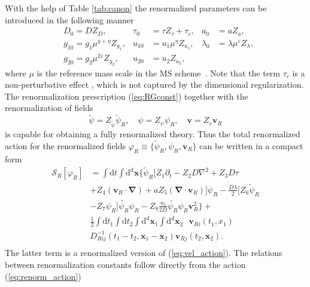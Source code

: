 \documentclass[aps,pre,url,twocolumn,superscriptaddress]{revtex4-1}
\def\eps{\varepsilon}
\def\mv{{\bm v}}
\def\S{\mathcal{S}}
\def\R{{\scriptscriptstyle R}}
\def\dRM{{\mathrm d}}
\def\mx{{\bm x}}
\begin{document}
With the help of Table \ref{tab:canon} the renormalized parameters can be introduced
in the following manner
\begin{align}
   \label{eq:RGconst}
   &D_0 = D Z_D, &\tau_0& = \tau Z_\tau + \tau_c,
     &a_0& = a Z_a,  
     \nonumber \\ 
   &g_{10} = g_{1} \mu^{y+\eta} Z_{g_1}, &u_{10}& = u_1 \mu^\eta Z_{u_1},
   &\lambda_0& = \lambda \mu^{\eps} Z_\lambda, \nonumber
   \\
   &g_{20}=g_2 \mu^{2\eps} Z_{g_2}, &u_{20}& = u_2 Z_{u_2}, 
\end{align}
where $\mu$ is the reference mass scale in the MS scheme~\cite{Zinn}. Note that
the term $\tau_c$ is a non-perturbative effect \cite{Sym73,Schloms89}, which
is not captured by the  dimensional regularization.
The renormalization prescription (\ref{eq:RGconst}) together with the 
renormalization of fields 
\begin{equation}
 \tilde{\psi} = Z_{\tilde{\psi}} \tilde\psi_{\R},\quad
 \psi = Z_\psi \psi_{ \R},\quad
 \mv = Z_v{\mv}_{\R} 
  \label{eq:RGfields}
\end{equation}
is capable for obtaining a fully renormalized theory.
Thus the total renormalized action for
the renormalized fields $\varphi_R \equiv \{\tilde\psi_{\R}, \psi_{\R}, \mv_{\R} \}$ 
  can be written in a compact form
\begin{align}
  \S_R[\varphi_\R] & = \int \dRM t \int \dRM^d \mx
  \biggl\{ \tilde{\psi}_\R \biggl[
  Z_1\partial_t - Z_2 D\nabla^2 + Z_3 D\tau \nonumber \\
  & + Z_4 (\bm{v}_\R\cdot \bm{\nabla}) 
    +  a Z_5 (\bm{\nabla}\cdot\bm{v}_\R) 
   \biggl] \psi_\R
  -  \frac{D\lambda}{2}[Z_6 \tilde{\psi}_\R \nonumber \\
  & - Z_7
  \psi_\R]\tilde{\psi_\R}\psi_\R - Z_8\frac{u_2}{2D}\tilde{\psi_\R} \psi_\R \bm{v}^2_\R \biggl\}
  + \nonumber\\
  &
  \frac{1}{2} 
  \int \dRM t_1 \int \dRM t_2 
  \int \dRM^d \mx_1 \int \dRM^d \mx_2
  \mbox{ }
  \mv_{Ri}(t_1,x_1) \nonumber \\
  &  D_{Rij}^{-1}(t_1-t_2,\mx_1-\mx_2) \mv_{Rj}(t_2,\mx_2).
  \nonumber\\
   \label{eq:renorm_action}
\end{align}
The latter term is a renormalized version of (\ref{eq:vel_action}).
The relations between 
renormalization constants follow directly from the action (\ref{eq:renorm_action}) 
\end{document}
